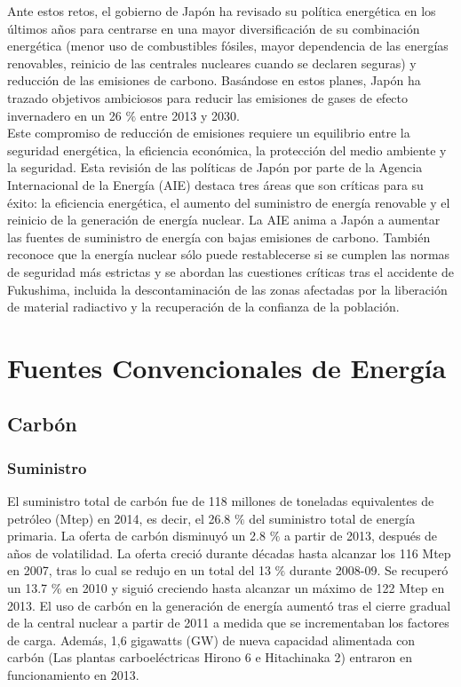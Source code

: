 \documentclass[]{article}
\begin{document}
Ante estos retos, el gobierno de Japón ha revisado su política energética en los últimos años para centrarse en una mayor diversificación de su combinación energética (menor uso de combustibles fósiles, mayor dependencia de las energías renovables, reinicio de las centrales nucleares cuando se declaren seguras) y reducción de las emisiones de carbono. Basándose en estos planes, Japón ha trazado objetivos ambiciosos para reducir las emisiones de gases de efecto invernadero en un 26 $\%$ entre 2013 y 2030.\\

Este compromiso de reducción de emisiones requiere un equilibrio entre la seguridad energética, la eficiencia económica, la protección del medio ambiente y la seguridad. Esta revisión de las políticas de Japón por parte de la Agencia Internacional de la Energía (AIE) destaca tres áreas que son críticas para su éxito: la eficiencia energética, el aumento del suministro de energía renovable y el reinicio de la generación de energía nuclear. La AIE anima a Japón a aumentar las fuentes de suministro de energía con bajas emisiones de carbono. También reconoce que la energía nuclear sólo puede restablecerse si se cumplen las normas de seguridad más estrictas y se abordan las cuestiones críticas tras el accidente de Fukushima, incluida la descontaminación de las zonas afectadas por la liberación de material radiactivo y la recuperación de la confianza de la población.\\


\section{Fuentes Convencionales de Energía}

\subsection{Carbón}

\subsubsection{Suministro}

El suministro total de carbón fue de 118 millones de toneladas equivalentes de petróleo (Mtep) en 2014, es decir, el 26.8 $\%$ del suministro total de energía primaria. La oferta de carbón disminuyó un 2.8 $\%$ a partir de 2013, después de años de volatilidad. La oferta creció durante décadas hasta alcanzar los 116 Mtep en 2007, tras lo cual se redujo en un total del 13 $\%$ durante 2008-09. Se recuperó un 13.7 $\%$ en 2010 y siguió creciendo hasta alcanzar un máximo de 122 Mtep en 2013. El uso de carbón en la generación de energía aumentó tras el cierre gradual de la central nuclear a partir de 2011 a medida que se incrementaban los factores de carga. Además, 1,6 gigawatts (GW) de nueva capacidad alimentada con carbón (Las plantas carboeléctricas Hirono 6 e Hitachinaka 2) entraron en funcionamiento en 2013.\\
\end{document}

